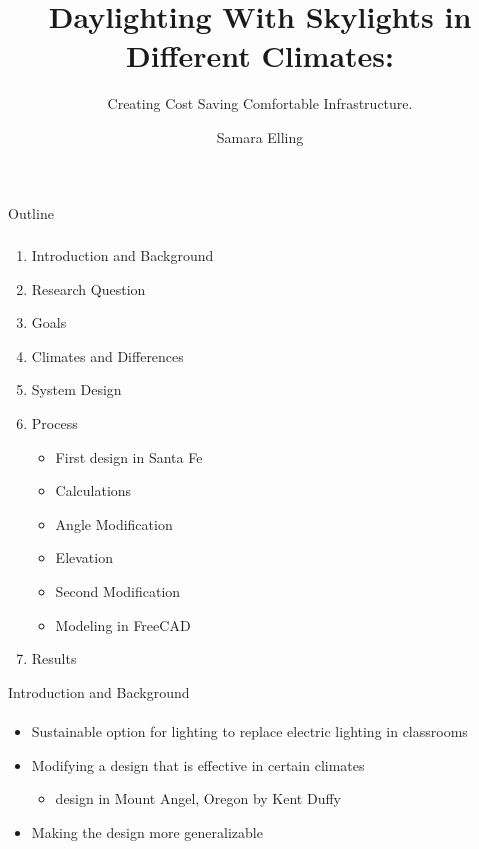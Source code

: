 \documentclass[aspectratio=168, 10pt] {beamer}
\title{Daylighting With Skylights in Different Climates:} %
\subtitle{Creating Cost Saving Comfortable Infrastructure.} %
\author{Samara Elling}
\begin{document}
  \shorthandoff{-}
  \frame[c]{\maketitle}

    \begin{frame} [label = outline]{Outline}
      \frametitle{ }
      \begin{enumerate}
        \item Introduction and Background
        \item Research Question
        \item Goals
        \item Climates and Differences
        \item System Design
        \item Process
        \begin{itemize}
            \item First design in Santa Fe
            \item Calculations
            \item Angle Modification
            \item Elevation
            \item Second Modification
            \item Modeling in FreeCAD
        \end{itemize}
        \item Results

      \end{enumerate}
    \end{frame}


    \begin{frame}[label=lists]{Introduction and Background}
      \framesubtitle{ }
      \begin{itemize}
        \item Sustainable option for lighting to replace electric lighting in classrooms
        \item Modifying a design that is effective in certain climates
        \begin{itemize}
            \item design in Mount Angel, Oregon by Kent Duffy
        \end{itemize}
        \item Making the design more generalizable
      \end{itemize}


    \end{frame}
\end{document}
